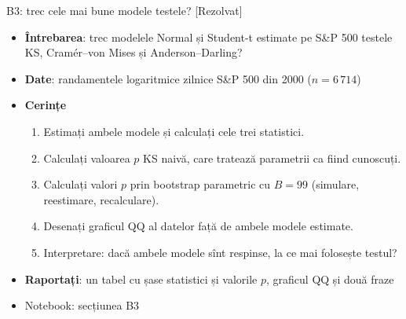 \begin{frame}{B3: trec cele mai bune modele testele? [Rezolvat]}
\itemsize{\footnotesize}
\begin{itemize}
\item \textbf{Întrebarea}: trec modelele Normal și Student-t estimate pe S\&P 500 testele KS, Cramér--von Mises și Anderson--Darling?
\item \textbf{Date}: randamentele logaritmice zilnice S\&P 500 din 2000 ($n = 6\,714$)
\item \textbf{Cerințe}
\begin{enumerate}
    \item Estimați ambele modele și calculați cele trei statistici.
    \item Calculați valoarea $p$ KS naivă, care tratează parametrii ca fiind cunoscuți.
    \item Calculați valori $p$ prin bootstrap parametric cu $B = 99$ (simulare, reestimare, recalculare).
    \item Desenați graficul QQ al datelor față de ambele modele estimate.
    \item Interpretare: dacă ambele modele sînt respinse, la ce mai folosește testul?
\end{enumerate}
\item \textbf{Raportați}: un tabel cu șase statistici și valorile $p$, graficul QQ și două fraze
\item Notebook: secțiunea B3
\end{itemize}
\end{frame}

